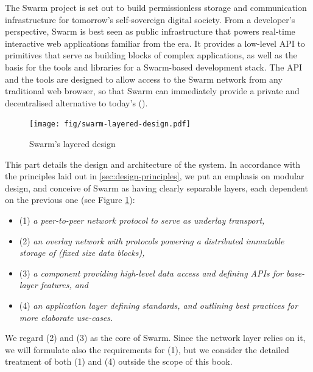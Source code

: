 
\green{}

The Swarm project is set out to build permissionless storage and communication infrastructure for tomorrow's self-sovereign digital society. From a developer's perspective, Swarm is best seen as public infrastructure that powers real-time interactive web applications familiar from the  era. It provides a low-level API to primitives that serve as building blocks of complex applications, as well as the basis for the tools and libraries for a Swarm-based  development stack. The API and the tools are designed to allow access to the Swarm network from any traditional web browser, so that Swarm can immediately provide a private and decentralised alternative to today's  ().

\begin{figure}[htbp]
  \centering
    \texttt{[image: fig/swarm-layered-design.pdf]}
  \caption[Swarm's layered design \statusgreen]{Swarm's layered design}
\label{fig:Swarm-layered-design}
\end{figure}

This part details the design and architecture of the system. In accordance with the principles laid out in \ref{sec:design-principles}, we put an emphasis on modular design, and conceive of Swarm as having clearly separable layers, each dependent on the previous one (see Figure \ref{fig:Swarm-layered-design}):

\begin{itemize}[noitemsep]
\item (1) \emph{a peer-to-peer network protocol to serve as underlay transport,}
\item (2) \emph{an overlay network with protocols powering a distributed immutable storage of  (fixed size data blocks),}
\item (3) \emph{a component providing high-level data access and defining APIs for base-layer features, and}
\item (4) \emph{an application layer defining standards, and outlining best practices for more elaborate use-cases.}
\end{itemize}

We regard (2) and (3) as the core of Swarm. Since the network layer relies on it, we will formulate also the requirements for (1), but we consider the detailed treatment of both (1) and (4) outside the scope of this book.


